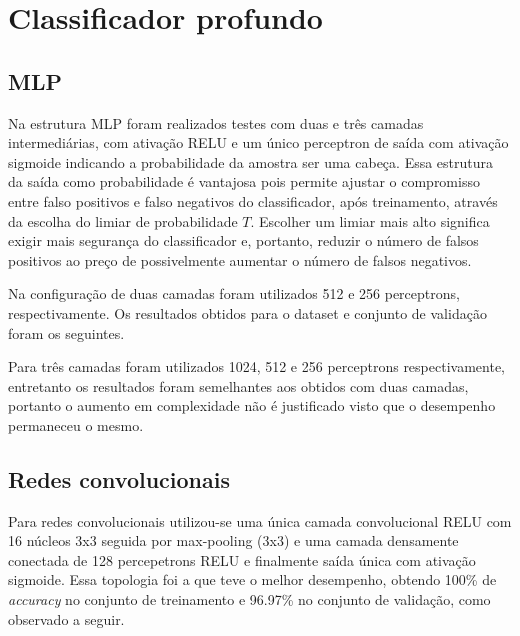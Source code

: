 \section{Classificador profundo}

\subsection{MLP}
Na estrutura MLP foram realizados testes com duas e três camadas intermediárias, com ativação RELU e um único perceptron de saída com ativação sigmoide indicando a probabilidade da amostra ser uma cabeça. Essa estrutura da saída como probabilidade é vantajosa pois permite ajustar o compromisso entre falso positivos e falso negativos do classificador, após treinamento, através da escolha do limiar de probabilidade $T$. Escolher um limiar mais alto significa exigir mais segurança do classificador e, portanto, reduzir o número de falsos positivos ao preço de possivelmente aumentar o número de falsos negativos.

Na configuração de duas camadas foram utilizados 512 e 256 perceptrons, respectivamente. Os resultados obtidos para o dataset e conjunto de validação foram os seguintes.
\begin{table}[h!]

\end{table}

Para três camadas foram utilizados 1024, 512 e 256 perceptrons respectivamente, entretanto os resultados foram semelhantes aos obtidos com duas camadas, portanto o aumento em complexidade não é justificado visto que o desempenho permaneceu o mesmo.

\subsection{Redes convolucionais}
Para redes convolucionais utilizou-se uma única camada convolucional RELU com 16 núcleos 3x3 seguida por max-pooling (3x3) e uma camada densamente conectada de 128 percepetrons RELU e finalmente saída única com ativação sigmoide. Essa topologia foi a que teve o melhor desempenho, obtendo 100\% de \textit{accuracy} no conjunto de treinamento e 96.97\% no conjunto de validação, como observado a seguir.

